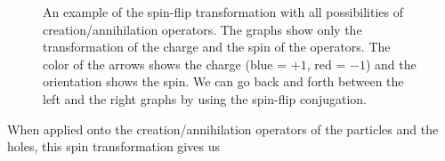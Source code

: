 \begin{figure}
\begin{center}
  \end{center}
  \caption{An example of the spin-flip transformation with all possibilities of creation/annihilation operators. The graphs show only the transformation of the charge and the spin of the operators. The color of the arrows shows the charge (blue = $+1$, red = $-1$) and the orientation shows the spin. We can go back and forth between the left and the right graphs by using the spin-flip conjugation.}
  \label{fig:spin-flip}
\end{figure}

When applied onto the creation/annihilation operators of the particles and the holes, this spin transformation gives us

